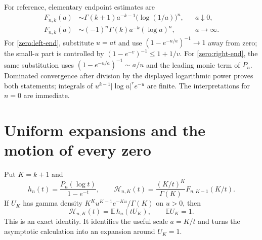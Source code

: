 For reference, elementary endpoint estimates are
\begin{align}
 F_{n,k}(a)&\sim \Gamma(k+1)a^{-k-1}\bigl(\log(1/a)\bigr)^n,
                  &&a\downarrow0,\label{zero:left-end}\\
 F_{n,k}(a)&\sim (-1)^n\Gamma(k)a^{-k}(\log a)^n,
                  &&a\to\infty.\label{zero:right-end}
\end{align}
For \eqref{zero:left-end}, substitute $u=at$ and use
$(1-e^{-u/a})^{-1}\to1$ away from zero; the small-$u$ part is
controlled by $(1-e^{-v})^{-1}\leq1+1/v$.
For \eqref{zero:right-end}, the same substitution uses
$(1-e^{-u/a})^{-1}\sim a/u$ and the leading monic term of $P_n$.
Dominated convergence after division by the displayed logarithmic
power proves both statements; integrals of $u^{k-1}|\log u|^r e^{-u}$
are finite.  The interpretations for $n=0$ are immediate.

\section{Uniform expansions and the motion of every zero}
\label{zero:asymptotic-section}

Put $K=k+1$ and
\[
 h_n(t)=\frac{P_n(\log t)}{1-e^{-t}},\qquad
 \mathcal H_{n,K}(t)=\frac{(K/t)^K}{\Gamma(K)}F_{n,K-1}(K/t).
\]
If $U_K$ has gamma density
$K^K u^{K-1}e^{-Ku}/\Gamma(K)$ on $u>0$, then
\begin{equation}\label{zero:expectation}
 \mathcal H_{n,K}(t)=\mathbb E\,h_n(tU_K),
 \qquad \mathbb E U_K=1.
\end{equation}
This is an exact identity.  It identifies the useful scale $a=K/t$
and turns the asymptotic calculation into an expansion around $U_K=1$.

